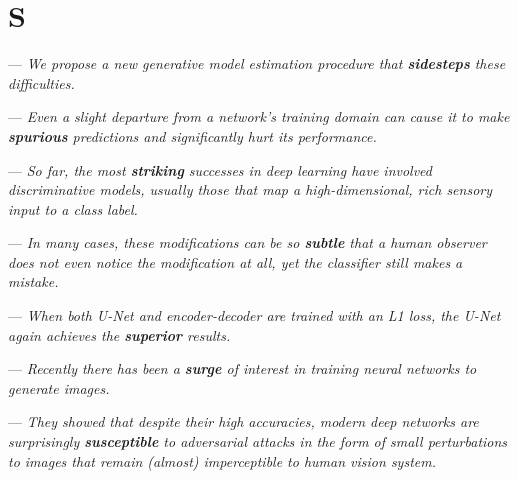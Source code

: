 \section{S}

 --- \textit{We propose a new generative model estimation procedure that \textbf{sidesteps} these difficulties.}

--- \textit{Even a slight departure from a network's training domain can cause it to make \textbf{spurious} predictions and significantly hurt its performance.}

 --- \textit{So far, the most \textbf{striking} successes in deep learning have involved discriminative models, usually those that map a high-dimensional, rich sensory input to a class label.}

--- \textit{In many cases, these modifications can be so \textbf{subtle} that a human observer does not even notice the modification at all, yet the classifier still makes a mistake.}

--- \textit{When both U-Net and encoder-decoder are trained with an L1 loss, the U-Net again achieves the \textbf{superior} results.}



--- \textit{Recently there has been a \textbf{surge} of interest in training neural networks to generate images.}


--- \textit{They showed that despite their high accuracies, modern deep
networks are surprisingly \textbf{susceptible} to adversarial attacks
in the form of small perturbations to images that remain
(almost) imperceptible to human vision system.}


